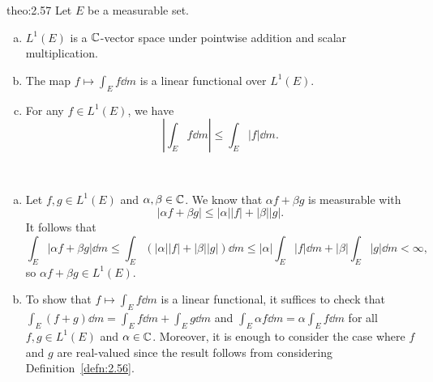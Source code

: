 \begin{theo}{theo:2.57}
    Let $E$ be a measurable set. 
    \begin{enumerate}[(a)]
        \item $L^1(E)$ is a $\mathbb{C}$-vector space under pointwise addition and 
        scalar multiplication. 
        \item The map $f \mapsto \int_E f\dd m$ is a linear functional
        over $L^1(E)$. 
        \item For any $f \in L^1(E)$, we have 
        \[ \left| \int_E f\dd m \right| \leq \int_E |f|\dd m. \] 
    \end{enumerate}
\end{theo}
\begin{pf}~
    \begin{enumerate}[(a)]
        \item Let $f, g \in L^1(E)$ and $\alpha, \beta \in \mathbb{C}$. We know that 
        $\alpha f + \beta g$ is measurable with 
        \[ |\alpha f + \beta g| \leq |\alpha||f| + |\beta||g|. \] 
        It follows that 
        \[ \int_E |\alpha f + \beta g|\dd m 
        \leq \int_E (|\alpha||f| + |\beta||g|)\dd m 
        \leq |\alpha| \int_E |f|\dd m + |\beta| \int_E |g|\dd m 
        < \infty, \] 
        so $\alpha f + \beta g \in L^1(E)$. 

        \item To show that $f \mapsto \int_E f\dd m$ is a linear functional, 
        it suffices to check that $\int_E (f+g)\dd m = \int_E f\dd m + 
        \int_E g\dd m$ and $\int_E \alpha f\dd m = \alpha \int_E f\dd m$ 
        for all $f, g \in L^1(E)$ and $\alpha \in \mathbb{C}$. Moreover, it is 
        enough to consider the case where $f$ and $g$ are real-valued 
        since the result follows from considering Definition~\ref{defn:2.56}. 


\end{enumerate}
\end{pf}
